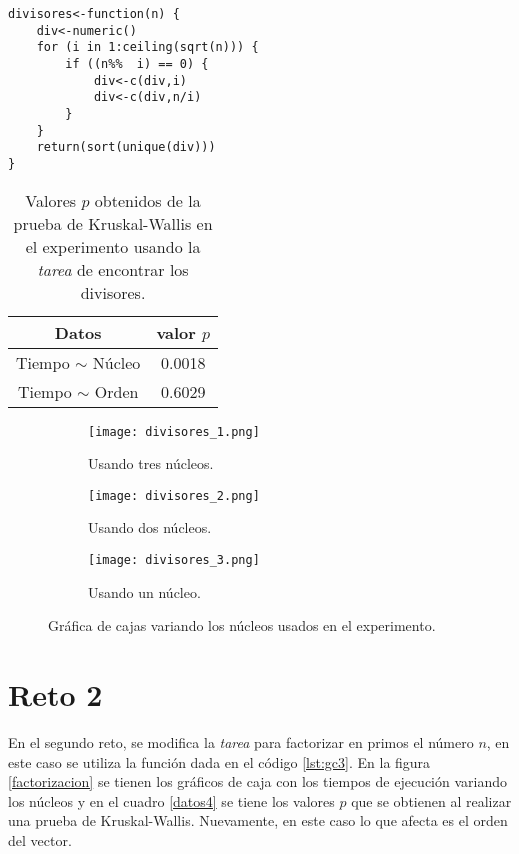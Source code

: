 \documentclass[12pt,letterpaper]{article}
\begin{document}
\begin{lstlisting}[label=lst:gc2,caption=Función para encontrar los divisores de un número., frame = single]
divisores<-function(n) {
    div<-numeric()
    for (i in 1:ceiling(sqrt(n))) {
        if ((n%%  i) == 0) {
            div<-c(div,i)
            div<-c(div,n/i)
        }
    }
    return(sort(unique(div)))
}
\end{lstlisting} 
\begin{table}
\centering
\caption{Valores $p$ obtenidos de la prueba de Kruskal-Wallis en el experimento usando la \textit{tarea} de encontrar los divisores.}
\begin{tabular}{|c|c|}
\hline 
Datos & valor $p$ \\ 
\hline 
Tiempo $\sim$ Núcleo & 0.0018 \\ 
\hline 
Tiempo $\sim$ Orden & 0.6029\\ 
\hline 
\end{tabular} 
\label{datos3}
\end{table} 
 \begin{figure}
 	\centering
 	\begin{subfigure}[b]{0.45\linewidth}
 		\texttt{[image: divisores\_1.png]}
 		 \caption{Usando tres núcleos.}
 		\label{divisores3}
 	\end{subfigure}
 	\begin{subfigure}[b]{0.45\linewidth}
 		\texttt{[image: divisores\_2.png]}
 		 \caption{Usando dos núcleos.}
 		\label{divisores2}
 	\end{subfigure}
 	\begin{subfigure}[b]{0.45\linewidth}
 		\texttt{[image: divisores\_3.png]}
 		\caption{Usando un núcleo.}
 		\label{divisores1}
 	\end{subfigure}
 	\caption{Gráfica de cajas variando los núcleos usados en el experimento.}  		
\label{divisores}
 \end{figure}
 \section{Reto 2}
En el segundo reto, se modifica la \textit{tarea} para factorizar en primos el número $n$, en este caso se utiliza la función dada en el código \ref{lst:gc3}. En la figura \ref{factorizacion} se tienen los gráficos de caja con los tiempos de ejecución variando los núcleos y en el cuadro \ref{datos4} se tiene los valores $p$ que se obtienen al realizar una prueba de Kruskal-Wallis. Nuevamente, en este caso lo que afecta es el orden del vector.
\end{document}
